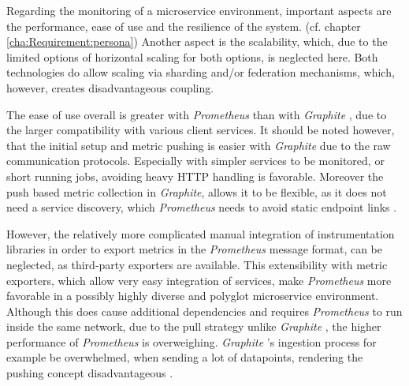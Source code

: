 Regarding the monitoring of a microservice environment, important aspects are the performance, ease of use and the resilience of the system. (cf. chapter \ref{cha:Requirement:persona})
Another aspect is the scalability, which, due to the limited options of horizontal scaling for both options, is neglected here.
Both technologies do allow scaling via sharding and/or federation mechanisms, which, however, creates disadvantageous coupling.

The ease of use overall is greater with \textit{Prometheus}  than with \textit{Graphite} , due to the larger compatibility with various client services.
It should be noted however, that the initial setup and metric pushing is easier with \textit{Graphite}  due to the raw communication protocols.
Especially with simpler services to be monitored, or short running jobs, avoiding heavy \ac{HTTP} handling is favorable.
Moreover the push based metric collection in \textit{Graphite}, allows it to be flexible, as it does not need a service discovery, which \textit{Prometheus}  needs to avoid static endpoint links \cite{Erez.2019}.


However, the relatively more complicated manual integration of instrumentation libraries in order to export metrics in the \textit{Prometheus}  message format, can be neglected, as third-party exporters are available.
This extensibility with metric exporters, which allow very easy integration of services, make \textit{Prometheus}  more favorable in a possibly highly diverse and polyglot microservice environment.
Although this does cause additional dependencies and requires \textit{Prometheus}  to
run inside the same network, due to the pull strategy unlike \textit{Graphite} , the higher performance of \textit{Prometheus}  is overweighing.
\textit{Graphite} 's ingestion process for example be overwhelmed, when sending a lot of datapoints, rendering the pushing concept disadvantageous \cite{Erez.2019}\cite{Frazier.2019}.


